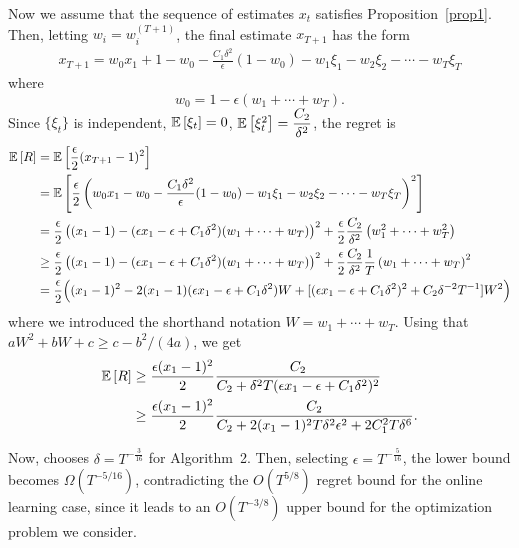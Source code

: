 \documentclass[11pt,letterpaper,english]{article}
\begin{document}
Now we assume that the sequence of estimates $x_t$ satisfies Proposition~\ref{prop1}. Then, letting $w_i=w^{(T+1)}_i$, the final estimate $x_{T+1}$ has the form
\begin{align*}
x_{T+1} = w_0 x_1 + 1-w_0 -\frac{C_1 \delta^2 }{\epsilon}(1-w_0) -w_1 \xi_1 - w_2 \xi_2 - \cdots - w_T \xi_T
\end{align*}
where
\[w_0 = 1-\epsilon (w_1+\cdots+w_T).\]
Since $\{\xi_t\}$ is independent, $\mathbb{E}\left[\xi_t\right]=0$, $\mathbb{E}\left[\xi_t^2\right]=\dfrac{C_2}{\delta^2}$, 
the regret is
\begin{align}
\mathbb{E}\left[R\right] &=\mathbb{E}\left[ \frac{\epsilon}{2} (x_{T+1}-1)^2\right] \nonumber \\
&= \mathbb{E}\left[\frac{\epsilon}{2} \left(w_0 x_1 -w_0 -\frac{C_1 \delta^2 }{\epsilon}(1-w_0) -w_1 \xi_1 - w_2 \xi_2 - \cdots - w_T \xi_T  \right)^2\right] \nonumber \\
&= \frac{\epsilon}{2} \left( (x_1-1)-(\epsilon x_1 -\epsilon +C_1\delta^2)(w_1+\cdots+w_T) \right)^2 + \dfrac{\epsilon}{2} \dfrac{C_2}{\delta^2} \left(w_1^2+\cdots+w_T^2  \right) \label{eq:lb2}\\
&\geq \dfrac{\epsilon}{2} \left( (x_1-1)-(\epsilon x_1 -\epsilon +C_1\delta^2)(w_1+\cdots+w_T) \right)^2 + \dfrac{\epsilon}{2} \dfrac{C_2}{\delta^2}\dfrac{1}{T} \left(w_1+\cdots+w_T  \right)^2 \nonumber \\
&= \frac{\epsilon}{2} \Bigl( (x_1-1)^2-2(x_1-1)(\epsilon x_1-\epsilon +C_1 \delta^2)W + [(\epsilon x_1-\epsilon +C_1 \delta^2)^2+C_2 \delta^{-2}T^{-1}]W^2  \Bigr)  \nonumber
\end{align}
where we introduced the shorthand notation $W = w_1+\cdots+w_T$.
Using that $a W^2 + bW +c \ge c-b^2/(4a)$, we get 
\begin{align*}
\mathbb{E}\left[R\right]  &\ge \frac{\epsilon (x_1-1)^2}{2} \frac{C_2}{C_2 + \delta^2 T(\epsilon x_1 - \epsilon +C_1 \delta^2)^2} \\
& \ge \frac{\epsilon (x_1-1)^2}{2} \frac{C_2}{C_2 + 2(x_1-1)^2 T \delta^2 \epsilon^2+ 2 C_1^2 T \delta^6}.
\end{align*}

Now,  \citet{DekelEK15} chooses $\delta=T^{-\frac{3}{16}}$ for Algorithm~2. Then, selecting $\epsilon = T^{-\frac{5}{16}}$, the lower bound becomes $\Omega(T^{-5/16})$, contradicting the $O(T^{5/8})$ regret bound for the online learning case, since it leads to an $O(T^{-3/8})$ upper bound for the optimization problem we consider.



\end{document}
